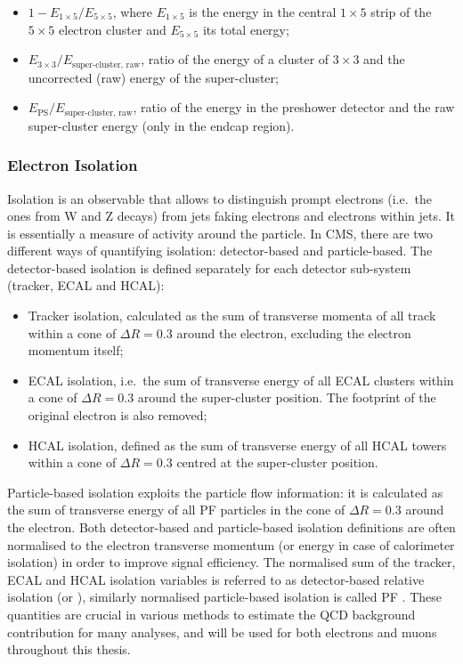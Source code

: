 \begin{itemize}
  \item $1-E_{1\times 5}/E_{5\times 5}$, where $E_{1\times 5}$ is the energy in the central $1\times 5$ strip of the
  $5\times 5$ electron cluster and $E_{5\times 5}$ its total energy;
  \item $E_{3\times 3}/E_\text{super-cluster, raw}$, ratio of the energy of a cluster of $3\times 3$ and the
  uncorrected (raw) energy of the super-cluster;
  \item $E_\text{PS}/E_\text{super-cluster, raw}$, ratio of the energy in the preshower detector and the raw
  super-cluster energy (only in the endcap region).
\end{itemize}

\subsubsection{Electron Isolation}
\label{sss:electron_isolation}

Isolation is an observable that allows to distinguish prompt electrons (i.e.\ the ones from W and Z decays) from jets
faking electrons and electrons within jets. It is essentially a measure of activity around the particle. In CMS, there
are two different ways of quantifying isolation: detector-based and particle-based. The detector-based isolation is
defined separately for each detector sub-system (tracker, ECAL and HCAL):

\begin{itemize}
  \item Tracker isolation, calculated as the sum of transverse momenta of all track within a cone of $\Delta R = 0.3$
  around the electron, excluding the electron momentum itself;
  \item ECAL isolation, i.e.\ the sum of transverse energy of all ECAL clusters within a cone of $\Delta R = 0.3$
  around the super-cluster position. The footprint of the original electron is also removed;
  \item HCAL isolation, defined as the sum of transverse energy of all HCAL towers within a cone of $\Delta R = 0.3$
  centred at the super-cluster position.
\end{itemize}

Particle-based isolation exploits the particle flow information: it is calculated as the sum of transverse energy of all
PF particles in the cone of $\Delta R = 0.3$ around the electron. Both detector-based and particle-based isolation
definitions are often normalised to the electron transverse momentum (or energy in case of calorimeter isolation) in
order to improve signal efficiency. The normalised sum of the tracker, ECAL and HCAL isolation variables is referred to
as detector-based relative isolation (or \reliso), similarly normalised particle-based isolation is called PF \reliso.
These quantities are crucial in various methods to estimate the QCD background contribution for many analyses, and will
be used for both electrons and muons throughout this thesis.

